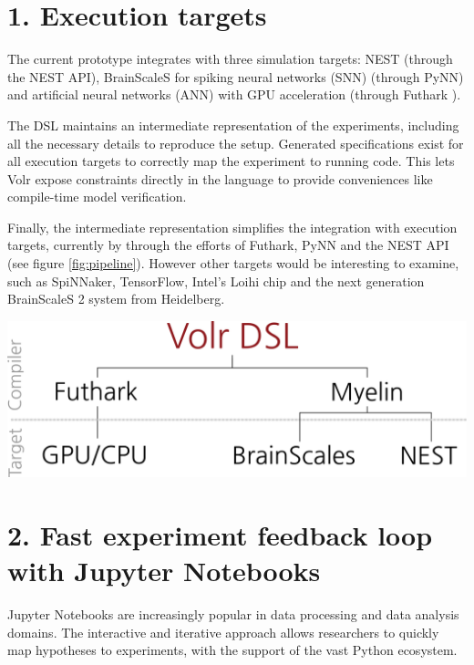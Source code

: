 \documentclass[a0,portrait]{a0poster}
\begin{document}
\begin{multicols}{2}
\section*{1. Execution targets}
The current prototype integrates with three simulation targets: NEST (through the NEST API), 
BrainScaleS for spiking neural networks (SNN) (through PyNN) and artificial neural networks 
(ANN) with GPU acceleration (through Futhark \cite{Henriksen2017}).

The DSL maintains an intermediate representation of the experiments, including all the 
necessary details to reproduce the setup.
Generated specifications exist for all execution targets to correctly map the experiment
to running code.
This lets Volr expose constraints directly in the language to provide conveniences like
compile-time model verification.

Finally, the intermediate representation simplifies the integration with execution targets,
currently by through the efforts of Futhark, PyNN and the NEST API (see figure
\ref{fig:pipeline}).
However other targets would be interesting to examine, such as SpiNNaker, TensorFlow, Intel's 
Loihi chip and the next generation BrainScaleS 2 system from Heidelberg.

\begin{center}\vspace{1.3cm}
\includegraphics[width=0.9\linewidth]{volr_pipeline}
\label{fig:pipeline}
\end{center}

\section*{2. Fast experiment feedback loop with Jupyter Notebooks}
Jupyter Notebooks are increasingly popular in data processing and data analysis domains.
The interactive and iterative approach allows researchers to quickly map hypotheses 
to experiments, with the support of the vast Python ecosystem.


\end{multicols}
\end{document}

